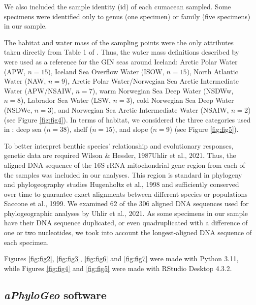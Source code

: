 We also included the sample identity (id) of each cumacean sampled. Some specimens were identified only to genus (one specimen) or family (five specimens) in our sample.
 
The habitat and water mass of the sampling points were the only attributes taken directly from Table 1 of \citep{uhlir_adding_2021}. Thus, the water mass definitions described by \citep{hansen_north_2000, brix2010distribution, ostmann_marine_2014} were used as a reference for the GIN seas around Iceland: Arctic Polar Water (APW, $n=15$), Iceland Sea Overflow Water (ISOW, $n=15$), North Atlantic Water (NAW, $n=9$), Arctic Polar Water/Norwegian Sea Arctic Intermediate Water (APW/NSAIW, $n=7$), warm Norwegian Sea Deep Water (NSDWw, $n=8$), Labrador Sea Water (LSW, $n=3$), cold Norwegian Sea Deep Water (NSDWc, $n=3$), and Norwegian Sea Arctic Intermediate Water (NSAIW, $n=2$) (see Figure \ref{fig:fig4}). In terms of habitat, we considered the three categories used in \citep{uhlir_adding_2021}: deep sea ($n=38$), shelf ($n=15$), and slope ($n=9$) (see Figure \ref{fig:fig5}).

To better interpret benthic species' relationship and evolutionary responses, genetic data are required Wilson & Hessler, 1987Uhlir et al., 2021. Thus, the aligned DNA sequence of the 16S rRNA mitochondrial gene region from each of the samples was included in our analyses. This region is standard in phylogeny and phylogeography studies Hugenholtz et al., 1998 and sufficiently conserved over time to guarantee exact alignments between different species or populations Saccone et al., 1999. We examined 62 of the 306 aligned DNA sequences used for phylogeographic analyses by Uhlir et al., 2021. As some specimens in our sample have their DNA sequence duplicated, or even quadruplicated with a difference of one or two nucleotides, we took into account the longest-aligned DNA sequence of each specimen.

Figures \ref{fig:fig2}, \ref{fig:fig3}, \ref{fig:fig6} and \ref{fig:fig7} were made with Python 3.11, while Figures \ref{fig:fig4} and \ref{fig:fig5} were made with RStudio Desktop 4.3.2.

\subsection{{\textit{aPhyloGeo} software}\label{aPhyloGeo-software}}

